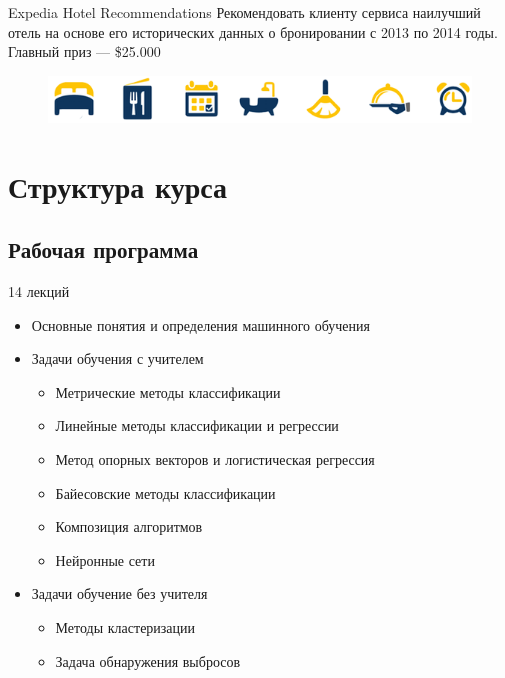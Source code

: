 \documentclass{beamer}
\begin{document}
\begin{frame}{Expedia Hotel Recommendations}
    Рекомендовать клиенту сервиса наилучший отель на основе его исторических данных о бронировании с 2013 по 2014 годы. Главный приз --- \$25.000
    \begin{figure}
        \includegraphics[width=\textwidth]{fig/expedia_icons.png}
    \end{figure}
\end{frame}

\section{Структура курса}
\subsection{Рабочая программа}
\begin{frame}{14 лекций}
    \begin{itemize}
        \item Основные понятия и определения машинного обучения
        \item Задачи обучения с учителем
        \begin{itemize}
            \item Метрические методы классификации
            \item Линейные методы классификации и регрессии
            \item Метод опорных векторов и логистическая регрессия
            \item Байесовские методы классификации
            \item Композиция алгоритмов
            \item Нейронные сети
        \end{itemize}
        \item Задачи обучение без учителя
        \begin{itemize}
            \item Методы кластеризации
            \item Задача обнаружения выбросов
        \end{itemize}
    \end{itemize}
\end{frame}
\end{document}
